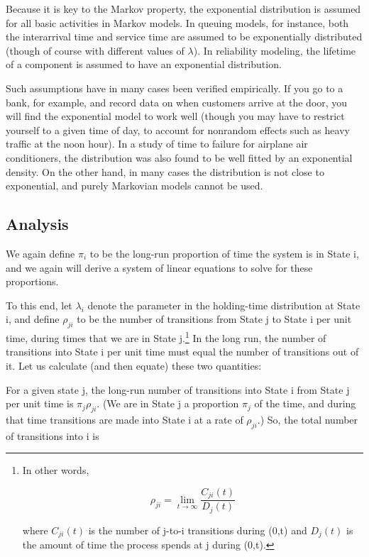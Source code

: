 \documentclass[11pt]{article}
\begin{document}
Because it is key to the Markov property, the exponential distribution
is assumed for all basic activities in Markov models. In queuing models,
for instance, both the interarrival time and service time are assumed to
be exponentially distributed (though of course with different values of
$\lambda$). In reliability modeling, the lifetime of a component is
assumed to have an exponential distribution.

Such assumptions have in many cases been verified empirically. If you go to
a bank, for example, and record data on when customers arrive at the
door, you will find the exponential model to work well (though you may
have to restrict yourself to a given time of day, to account for
nonrandom effects such as heavy traffic at the noon hour). In a study of
time to failure for airplane air conditioners, the distribution was also
found to be well fitted by an exponential density.  On the other hand,
in many cases the distribution is not close to exponential, and purely
Markovian models cannot be used.

\subsection{Analysis}

We again define $\pi_{i}$ to be the long-run proportion of time the
system is in State i, and we again will derive a system of linear
equations to solve for these proportions.

To this end, let $\lambda_{i}$ denote the parameter in the
holding-time distribution at State i, and define $\rho_{ji}$ to be
the number of transitions from State j to State i per unit time, during
times that we are in State j.\footnote{In other words, 

$$
\rho_{ji} = \lim_{{t} \rightarrow \infty} \frac{C_{ji}(t)}{D_j(t)}
$$

\noindent where $C_{ji}(t)$ is the number of j-to-i transitions during
(0,t) and $D_j(t)$ is the amount of time the process spends at j during
(0,t).} In the long run, the number of transitions into State i per unit
time must equal the number of transitions out of it. Let us calculate
(and then equate) these two quantities:  

For a given state j, the long-run number of transitions into State i
from State j per unit time is $\pi_{j}\rho_{ji}$. (We are in State
j a proportion $\pi_{j}$ of the time, and during that time
transitions are made into State i at a rate of $\rho_{ji}$.) So, the
total number of transitions into i is
\end{document}
